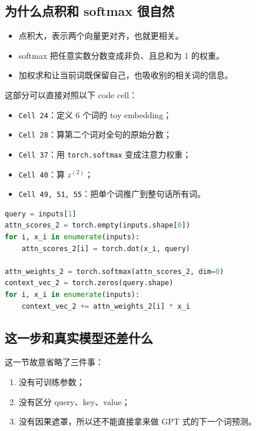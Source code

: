 \documentclass[11pt,a4paper]{ctexart}
\begin{document}
\subsection{为什么点积和 softmax 很自然}

\begin{itemize}
  \item 点积大，表示两个向量更对齐，也就更相关。
  \item softmax 把任意实数分数变成非负、且总和为 1 的权重。
  \item 加权求和让当前词既保留自己，也吸收别的相关词的信息。
\end{itemize}

\begin{codeblock}
这部分可以直接对照以下 code cell：
\begin{itemize}
  \item \texttt{Cell 24}：定义 6 个词的 toy embedding；
  \item \texttt{Cell 28}：算第二个词对全句的原始分数；
  \item \texttt{Cell 37}：用 \texttt{torch.softmax} 变成注意力权重；
  \item \texttt{Cell 40}：算 \(z^{(2)}\)；
  \item \texttt{Cell 49, 51, 55}：把单个词推广到整句话所有词。
\end{itemize}

\begin{lstlisting}[language=Python]
query = inputs[1]
attn_scores_2 = torch.empty(inputs.shape[0])
for i, x_i in enumerate(inputs):
    attn_scores_2[i] = torch.dot(x_i, query)

attn_weights_2 = torch.softmax(attn_scores_2, dim=0)
context_vec_2 = torch.zeros(query.shape)
for i, x_i in enumerate(inputs):
    context_vec_2 += attn_weights_2[i] * x_i
\end{lstlisting}
\end{codeblock}

\subsection{这一步和真实模型还差什么}

这一节故意省略了三件事：

\begin{enumerate}
  \item 没有可训练参数；
  \item 没有区分 query、key、value；
  \item 没有因果遮罩，所以还不能直接拿来做 GPT 式的下一个词预测。
\end{enumerate}
\end{document}

